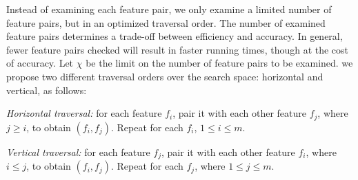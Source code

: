  Instead of examining each feature pair, we only examine a limited number of feature pairs, but in an optimized traversal order. The number of examined feature pairs determines a trade-off between efficiency and accuracy. In general, fewer feature pairs checked will result in faster running times, though at the cost of accuracy. 
 Let $\chi$ be the limit on the number of feature pairs to be examined. 
we propose two different traversal orders over the search space: horizontal and vertical, as follows:
\squishlist
\item \emph{Horizontal traversal:} for each feature $f_i$, pair it with each other feature $f_j$, where $j\geq i$, to obtain $(f_i,f_j)$. Repeat for each $f_i$, $1 \leq i\leq m$. 
\item \emph{Vertical traversal:} for each feature $f_j$, pair it with each other feature $f_i$, where $i\leq j$, to obtain $(f_i,f_j)$. Repeat for each $f_j$, where $1 \leq j\leq m$.
\squishend
\noindent
{}


